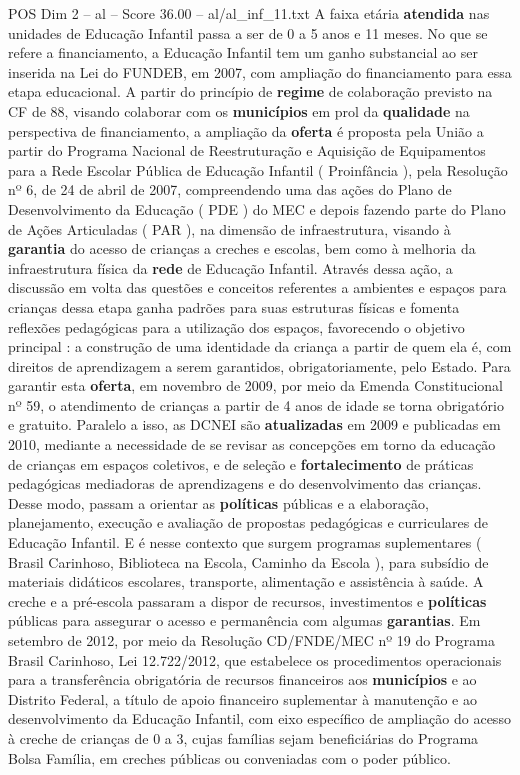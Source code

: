 \begin{textsample}{POS Dim 2 – al – Score 36.00 – al/al\_inf\_11.txt}
A faixa etária \textbf{atendida} nas unidades de Educação Infantil passa a ser de 0 a 5 anos e 11 meses.
No que se refere a financiamento, a Educação Infantil tem um ganho substancial ao ser inserida na Lei do FUNDEB, em 2007, com ampliação do financiamento para essa etapa educacional.
A partir do princípio de \textbf{regime} de colaboração previsto na CF de 88, visando colaborar com os \textbf{municípios} em prol da \textbf{qualidade} na perspectiva de financiamento, a ampliação da \textbf{oferta} é proposta pela União a partir do Programa Nacional de Reestruturação e Aquisição de Equipamentos para a Rede Escolar Pública de Educação Infantil ( Proinfância ), pela Resolução nº 6, de 24 de abril de 2007, compreendendo uma das ações do Plano de Desenvolvimento da Educação ( PDE ) do MEC e depois fazendo parte do Plano de Ações Articuladas ( PAR ), na dimensão de infraestrutura, visando à \textbf{garantia} do acesso de crianças a creches e escolas, bem como à melhoria da infraestrutura física da \textbf{rede} de Educação Infantil.
Através dessa ação, a discussão em volta das questões e conceitos referentes a ambientes e espaços para crianças dessa etapa ganha padrões para suas estruturas físicas e fomenta reflexões pedagógicas para a utilização dos espaços, favorecendo o objetivo principal : a construção de uma identidade da criança a partir de quem ela é, com direitos de aprendizagem a serem garantidos, obrigatoriamente, pelo Estado.
Para garantir esta \textbf{oferta}, em novembro de 2009, por meio da Emenda Constitucional nº 59, o atendimento de crianças a partir de 4 anos de idade se torna obrigatório e gratuito.
Paralelo a isso, as DCNEI são \textbf{atualizadas} em 2009 e publicadas em 2010, mediante a necessidade de se revisar as concepções em torno da educação de crianças em espaços coletivos, e de seleção e \textbf{fortalecimento} de práticas pedagógicas mediadoras de aprendizagens e do desenvolvimento das crianças.
Desse modo, passam a orientar as \textbf{políticas} públicas e a elaboração, planejamento, execução e avaliação de propostas pedagógicas e curriculares de Educação Infantil.
E é nesse contexto que surgem programas suplementares ( Brasil Carinhoso, Biblioteca na Escola, Caminho da Escola ), para subsídio de materiais didáticos escolares, transporte, alimentação e assistência à saúde.
A creche e a pré-escola passaram a dispor de recursos, investimentos e \textbf{políticas} públicas para assegurar o acesso e permanência com algumas \textbf{garantias}.
Em setembro de 2012, por meio da Resolução CD/FNDE/MEC nº 19 do Programa Brasil Carinhoso, Lei 12.722/2012, que estabelece os procedimentos operacionais para a transferência obrigatória de recursos financeiros aos \textbf{municípios} e ao Distrito Federal, a título de apoio financeiro suplementar à manutenção e ao desenvolvimento da Educação Infantil, com eixo específico de ampliação do acesso à creche de crianças de 0 a 3, cujas famílias sejam beneficiárias do Programa Bolsa Família, em creches públicas ou conveniadas com o poder público.

\end{textsample}
